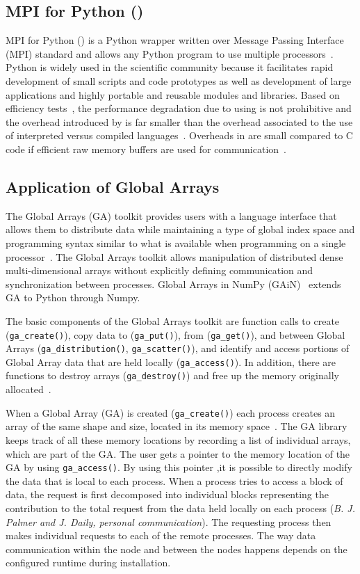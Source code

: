 \label{Software}
\subsection{MPI for Python ()}
MPI for Python () is a Python wrapper written over Message Passing Interface (MPI) standard and allows any Python program to use multiple processors~\cite{Dalcin:2011aa, Dalcin:2005aa}.
Python is widely used in the scientific community because it facilitates rapid development of small scripts and code prototypes as well as development of large applications and highly portable and reusable modules and libraries.
Based on efficiency tests~\cite{Dalcin:2011aa, Dalcin:2005aa}, the performance degradation due to using  is not prohibitive and the overhead introduced by  is far smaller than the overhead associated to the use of interpreted versus compiled languages~\cite{GAiN}.
Overheads in  are small compared to C code if efficient raw memory buffers are used for communication~\cite{Dalcin:2011aa}.

\subsection{Application of Global Arrays}
The Global Arrays (GA) toolkit provides users with a language interface that allows them to distribute data while maintaining a type of global index space and programming syntax similar to what is available when programming on a single processor~\cite{GA}. The Global Arrays toolkit allows manipulation of distributed dense multi-dimensional arrays without explicitly defining communication and synchronization between processes.
Global Arrays in NumPy (GAiN)~\cite{GAiN} extends GA to Python through Numpy. 

The basic components of the Global Arrays toolkit are function calls to create (\texttt{ga\_create()}), copy data to (\texttt{ga\_put()}), from (\texttt{ga\_get()}), and between Global Arrays (\texttt{ga\_distribution()}, \texttt{ga\_scatter()}), and identify and access portions of Global Array data that are held locally (\texttt{ga\_access()}).
In addition, there are functions to destroy arrays (\texttt{ga\_destroy()}) and free up the memory originally allocated~\cite{GAiN}.

When a Global Array (GA) is created (\texttt{ga\_create()}) each process creates an array of the same shape and size, located in its memory space~\cite{GA}. 
The GA library keeps track of all these memory locations by recording a list of individual arrays, which are part of the GA. 
The user gets a pointer to the memory location of the GA by using \texttt{ga\_access()}.
By using this pointer ,it is possible to directly modify the data that is local to each process.
When a process tries to access a block of data, the request is first decomposed into individual blocks representing the contribution to the total request from the data held locally on each process (\textit{B. J. Palmer and J. Daily, personal communication}).
The requesting process then makes individual requests to each of the remote processes. 
The way data communication within the node and between the nodes happens depends on the configured runtime during installation.

